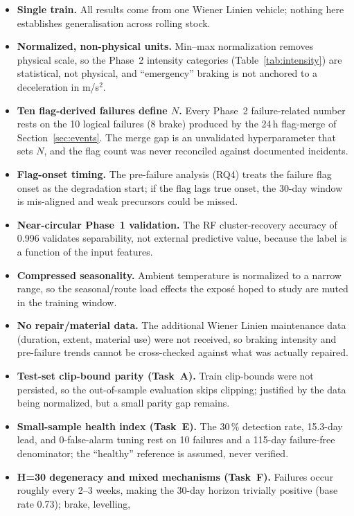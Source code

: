 \documentclass[11pt,a4paper]{article}
\begin{document}
\begin{itemize}[leftmargin=1.4em,itemsep=0.2em]
\item \textbf{Single train.} All results come from one Wiener Linien vehicle; nothing here
establishes generalisation across rolling stock.
\item \textbf{Normalized, non-physical units.} Min--max normalization removes physical
scale, so the Phase~2 intensity categories (Table~\ref{tab:intensity}) are statistical,
not physical, and ``emergency'' braking is not anchored to a deceleration in m/s$^2$.
\item \textbf{Ten flag-derived failures define $N$.} Every Phase~2 failure-related number
rests on the 10 logical failures (8 brake) produced by the 24\,h flag-merge of
Section~\ref{sec:events}. The merge gap is an unvalidated hyperparameter that sets $N$, and
the flag count was never reconciled against documented incidents.
\item \textbf{Flag-onset timing.} The pre-failure analysis (RQ4) treats the failure flag
onset as the degradation start; if the flag lags true onset, the 30-day window is
mis-aligned and weak precursors could be missed.
\item \textbf{Near-circular Phase~1 validation.} The RF cluster-recovery accuracy of 0.996
validates separability, not external predictive value, because the label is a function of
the input features.
\item \textbf{Compressed seasonality.} Ambient temperature is normalized to a narrow
range, so the seasonal/route load effects the exposé hoped to study are muted in the
training window.
\item \textbf{No repair/material data.} The additional Wiener Linien maintenance data
(duration, extent, material use) were not received, so braking intensity and pre-failure
trends cannot be cross-checked against what was actually repaired.
\item \textbf{Test-set clip-bound parity (Task~A).} Train clip-bounds were not persisted,
so the out-of-sample evaluation skips clipping; justified by the data being normalized,
but a small parity gap remains.
\item \textbf{Small-sample health index (Task~E).} The 30\,\% detection rate, 15.3-day
lead, and 0-false-alarm tuning rest on 10 failures and a 115-day failure-free denominator;
the ``healthy'' reference is assumed, never verified.
\item \textbf{H=30 degeneracy and mixed mechanisms (Task~F).} Failures occur roughly every
2--3 weeks, making the 30-day horizon trivially positive (base rate 0.73); brake, levelling,

\end{itemize}
\end{document}
